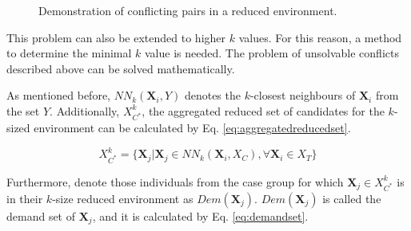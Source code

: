 		\begin{figure}[h]
			\centering
                \captionsetup{justification=centering}
			\caption{Demonstration of conflicting pairs in a reduced environment. %
			}
			\label{fig:conflict_example}
		\end{figure}
								
		This problem can also be extended to higher $k$ values. For this reason, a method to determine the minimal $k$ value is needed. The problem of unsolvable conflicts described above can be solved mathematically.
								
		As mentioned before, $NN_k (\textbf{X}_i,Y)$ denotes the $k$-closest neighbours of $\textbf{X}_i$ from the set $Y$. Additionally, $X_{C^*}^{k}$, the aggregated reduced set of candidates for the $k$-sized environment can be calculated by Eq. \ref{eq:aggregatedreducedset}.
								
		\begin{equation}
			X_{C^*}^{k}=\{\textbf{X}_j | \textbf{X}_j \in NN_k (\textbf{X}_i,X_C), \forall \textbf{X}_i \in X_T\}
			\label{eq:aggregatedreducedset}
		\end{equation}
								
		Furthermore, denote those individuals from the case group for which $\textbf{X}_j \in X_{C^*}^{k}$ is in their $k$-size reduced environment as $Dem(\textbf{X}_j)$. $Dem(\textbf{X}_j)$ is called the demand set of $\textbf{X}_j$, and it is calculated by Eq. \ref{eq:demandset}.
								
